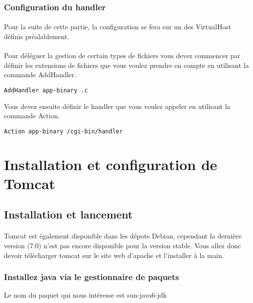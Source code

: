 \documentclass[12pt,a4paper]{article}
\begin{document}
\subsubsection{Configuration du handler}
\paragraph{}
Pour la suite de cette partie, la configuration se fera sur un des VirtualHost définis préalablement.

\paragraph{}
Pour déléguer la gestion de certain types de fichiers vous devez commencer par définir les extensions de fichiers que vous voulez prendre en compte en utilisant la commande AddHandler.

\begin{lstlisting}
AddHandler app-binary .c 
\end{lstlisting}

Vous devez ensuite définir le handler que vous voulez appeler en utilisant la commande Action.

\begin{lstlisting}
Action app-binary /cgi-bin/handler
\end{lstlisting}

\section{Installation et configuration de Tomcat}

\subsection{Installation et lancement}

\paragraph{}
Tomcat est également disponible dans les dépots Debian, cependant la dernière version (7.0) n'est pas encore disponible pour la version stable. Vous allez donc devoir télécharger tomcat sur le site web d'apache et l'installer à la main.

\subsubsection{Installez java via le gestionnaire de paquets}
Le nom du paquet qui nous intéresse est sun-java6-jdk
\end{document}
